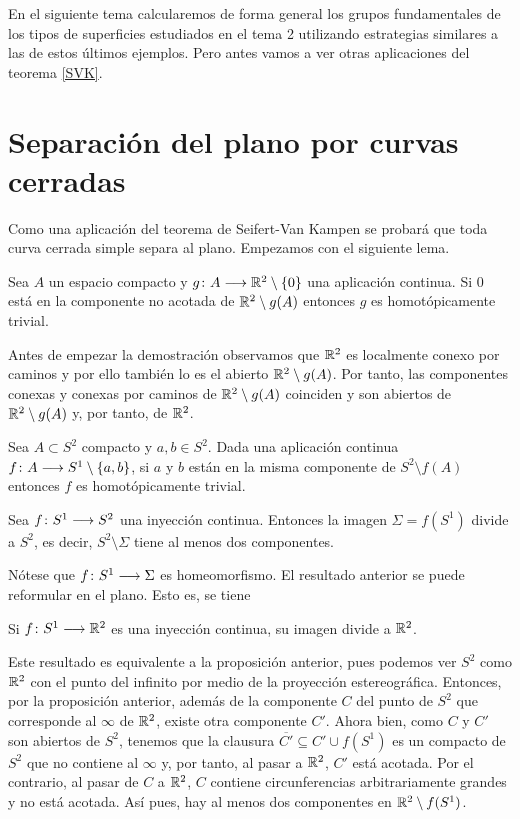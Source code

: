 \documentclass[GTSResumen.tex]{subfiles}
\begin{document}
En el siguiente tema calcularemos de forma general los grupos fundamentales de los tipos de superficies estudiados en el tema 2 utilizando estrategias similares a las de estos últimos ejemplos. Pero antes vamos a ver otras aplicaciones del teorema \ref{SVK}.
\newpage
\section{Separación del plano por curvas cerradas}

Como una aplicación del teorema de Seifert-Van Kampen se probará que toda curva cerrada simple separa al plano. Empezamos con el siguiente lema.

\begin{lemma}\label{1}
Sea $A$ un espacio compacto y $g\colon{A}\longrightarrow{\mathbb{R}^2\setminus\{0\}}$ una aplicación continua. Si $0$ está en la componente no acotada de $\mathbb{R}^2\setminus g(A)$  entonces $g$ es homotópicamente trivial.
\end{lemma}

Antes de empezar la demostración observamos que $\mathbb{R}^2$ es localmente conexo por caminos y por ello también lo es el abierto $\mathbb{R}^2\setminus g(A)$. Por tanto, las componentes conexas y conexas por caminos de $\mathbb{R}^2\setminus g(A)$ coinciden y son abiertos de $\mathbb{R}^2\setminus g(A)$ y, por tanto, de $\mathbb{R}^2$.


\begin{lemma}\label{2}
Sea $A\subset S^2$ compacto y $a,b\in S^2$. Dada una aplicación continua $f\colon{A}\longrightarrow{S^1\setminus\{a,b\}}$, si $a$ y $b$ están en la misma componente de $S^2\setminus f(A)$ entonces $f$ es homotópicamente trivial. 
\end{lemma}


\begin{prop}
Sea $f\colon{S^1}\longrightarrow{S^2}$ una inyección continua. Entonces la imagen $\Sigma=f(S^1)$ divide a $S^2$, es decir, $S^2\setminus\Sigma$ tiene al menos dos componentes.
\end{prop}

Nótese que $f\colon{S^1}\longrightarrow{\Sigma}$ es homeomorfismo. El resultado anterior se puede reformular en el plano. Esto es, se tiene

\begin{prop} 
Si $f\colon{S^1}\longrightarrow{\mathbb{R}^2}$ es una inyección continua, su imagen divide a $\mathbb{R}^2$.
\end{prop}

Este resultado es equivalente a la proposición anterior, pues podemos ver $S^2$ como $\mathbb{R}^2$ con el punto del infinito por medio de la proyección estereográfica. Entonces, por la proposición anterior, además de la componente $C$ del punto de $S^2$ que corresponde al $\infty$ de $\mathbb{R}^2$, existe otra componente $C'$. Ahora bien, como $C$ y $C'$ son abiertos de $S^2$, tenemos que la clausura $\overline{C'}\subseteq C'\cup f(S^1)$ es un compacto de $S^2$ que no contiene al $\infty$ y, por tanto, al pasar a $\mathbb{R}^2$, $C'$ está acotada. Por el contrario, al pasar de $C$ a $\mathbb{R}^2$, $C$ contiene circunferencias arbitrariamente grandes y no está acotada. Así pues, hay al menos dos componentes en $\mathbb{R}^2\setminus f(S^1)$.
\end{document}
